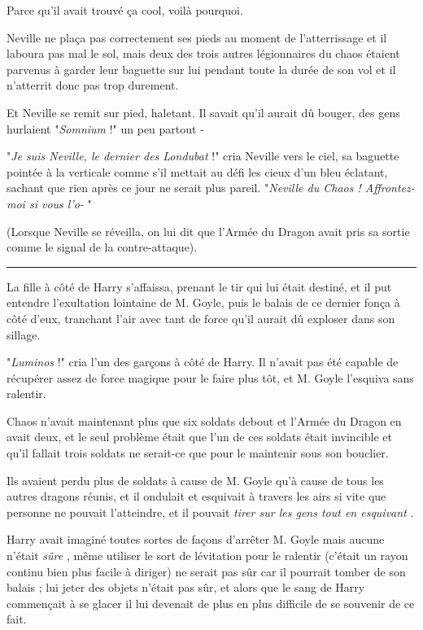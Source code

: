 Parce qu'il avait trouvé ça cool, voilà pourquoi.

Neville ne plaça pas correctement ses pieds au moment de l'atterrissage et il laboura pas mal le sol, mais deux des trois autres légionnaires du chaos étaient parvenus à garder leur baguette sur lui pendant toute la durée de son vol et il n'atterrit donc pas trop durement.

Et Neville se remit sur pied, haletant. Il savait qu'il aurait dû bouger, des gens hurlaient "\emph{Somnium}  !" un peu partout -

"\emph{Je suis Neville, le dernier des Londubat}  !" cria Neville vers le ciel, sa baguette pointée à la verticale comme s'il mettait au défi les cieux d'un bleu éclatant, sachant que rien après ce jour ne serait plus pareil. "\emph{Neville du Chaos ! Affrontez-moi si vous l'o-} "

(Lorsque Neville se réveilla, on lui dit que l'Armée du Dragon avait pris sa sortie comme le signal de la contre-attaque).
\par\noindent\rule{\textwidth}{0.4pt}
La fille à côté de Harry s'affaissa, prenant le tir qui lui était destiné, et il put entendre l'exultation lointaine de M. Goyle, puis le balais de ce dernier fonça à côté d'eux, tranchant l'air avec tant de force qu'il aurait dû exploser dans son sillage.

"\emph{Luminos}  !" cria l'un des garçons à côté de Harry. Il n'avait pas été capable de récupérer assez de force magique pour le faire plus tôt, et M. Goyle l'esquiva sans ralentir.

Chaos n'avait maintenant plus que six soldats debout et l'Armée du Dragon en avait deux, et le seul problème était que l'un de ces soldats était invincible et qu'il fallait trois soldats ne serait-ce que pour le maintenir sous son bouclier.

Ils avaient perdu plus de soldats à cause de M. Goyle qu'à cause de tous les autres dragons réunis, et il ondulait et esquivait à travers les airs si vite que personne ne pouvait l'atteindre, et il pouvait \emph{tirer sur les gens tout en esquivant} .

Harry avait imaginé toutes sortes de façons d'arrêter M. Goyle mais aucune n'était \emph{sûre} , même utiliser le sort de lévitation pour le ralentir (c'était un rayon continu bien plus facile à diriger) ne serait pas sûr car il pourrait tomber de son balais ; lui jeter des objets n'était pas sûr, et alors que le sang de Harry commençait à se glacer il lui devenait de plus en plus difficile de se souvenir de ce fait.


